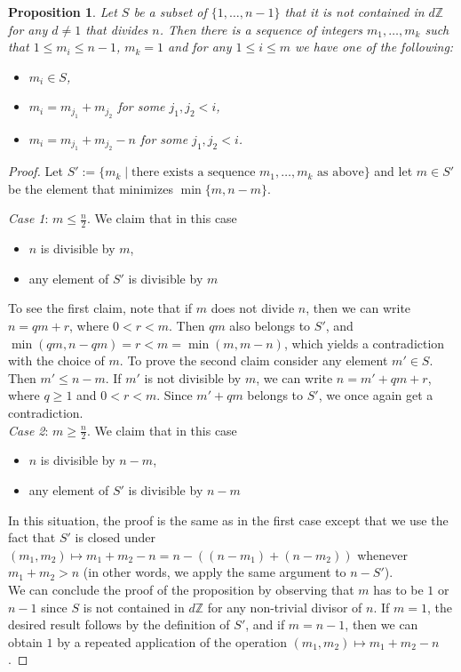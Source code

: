 \documentclass{amsart}
\newtheorem{proposition}[theorem]{Proposition}
\begin{document}
\begin{proposition}\label{sequenceProposition}
    Let $S$ be a subset of $\{1, \ldots, n - 1\}$ that it is not contained in $d \mathbb{Z}$ for any $d \neq 1$ that divides $n$. Then there is a sequence of integers $m_1, \ldots, m_k$ such that $1 \leq m_i \leq n - 1$, $m_k = 1$ and for any $1 \leq i \leq m$ we have one of the following:
    \begin{itemize}
        \item $m_i \in S$,
        \item $m_i = m_{j_1} + m_{j_2}$ for some $j_1, j_2 < i$,
        \item $m_i = m_{j_1} + m_{j_2} - n$ for some $j_1, j_2 < i$.
    \end{itemize}
\end{proposition}

\begin{proof}
Let $S':= \{m_k \mid \text{there exists a sequence } m_1, \ldots, m_k \text{ as above}\}$ and let $m \in S'$ be the element that minimizes $\min\{m, n - m\}$.

\textit{Case 1}: $m \leq \frac{n}{2}$. We claim that in this case 
\begin{itemize}
    \item $n$ is divisible by $m$,
    \item any element of $S'$ is divisible by $m$
\end{itemize}
To see the first claim, note that if $m$ does not divide $n$, then we can write $n = qm + r$, where $0 < r < m$. Then $qm$ also belongs to $S'$, and $\min(qm, n - qm) = r < m = \min(m, m - n)$, which yields a contradiction with the choice of $m$. To prove the second claim consider any element $m' \in S$. Then $m' \leq n - m$. If $m'$ is not divisible by $m$, we  can write $n = m' + qm + r$, where $q \geq 1$ and $0 < r < m$. Since $m'+ qm$ belongs to $S'$, we once again get a contradiction.\\
\textit{Case 2}: $m \geq \frac{n}{2}$. We claim that in this case 
\begin{itemize}
    \item $n$ is divisible by $n - m$,
    \item any element of $S'$ is divisible by $n - m$
\end{itemize}
In this situation, the proof is the same as in the first case except that we use the fact that $S'$ is closed under $(m_1, m_2) \mapsto m_1 + m_2 - n = n - ((n - m_1) + (n - m_2))$ whenever $m_1 + m_2 > n$ (in other words, we apply the same argument to $n - S'$). \\
We can conclude the proof of the proposition by observing that $m$ has to be $1$ or $n - 1$ since $S$ is not contained in $d \mathbb{Z}$ for any non-trivial divisor of $n$. If $m = 1$, the desired result follows by the definition of $S'$, and if $m = n - 1$, then we can obtain $1$ by a repeated application of the operation  $(m_1, m_2) \mapsto m_1 + m_2 - n$.
\end{proof}
\end{document}
